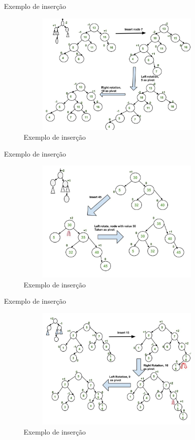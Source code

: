 \begin{frame}
	\begin{block}{Exemplo de inserção}
		\begin{figure}[!htb]
			\centering	  				
			\includegraphics[height=6cm, width = 10cm]{./pic/AVL_exemplo_01.jpg}
			\caption{Exemplo de inserção  \cite{GEEKS_2018}}
		\end{figure}
	\end{block}
\end{frame}

\begin{frame}
	\begin{block}{Exemplo de inserção}
		\begin{figure}[!htb]
			\centering	  				
			\includegraphics[height=6cm, width = 10cm]{./pic/AVL_exemplo_02.jpg}
			\caption{Exemplo de inserção  \cite{GEEKS_2018}}
		\end{figure}
	\end{block}
\end{frame}

\begin{frame}
	\begin{block}{Exemplo de inserção}
		\begin{figure}[!htb]
			\centering	  				
			\includegraphics[height=6cm, width = 10cm]{./pic/AVL_exemplo_03.jpg}
			\caption{Exemplo de inserção  \cite{GEEKS_2018}}
		\end{figure}
	\end{block}
\end{frame}

